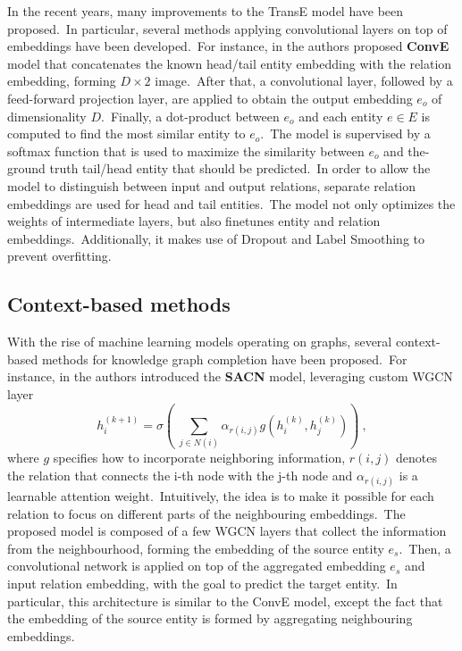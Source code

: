 \documentclass[longabstract, english, mgr]{iithesis}
\theoremstyle{default_theorem_style}\newtheorem{theorem}{Theorem}
\theoremstyle{default_theorem_style}\newtheorem{definition}{Definition}
\begin{document}
\noindent In the recent years, many improvements to the TransE model have been proposed.\ In particular, several
methods applying convolutional layers on top of embeddings have been developed.\ For instance, in \cite{conve_model} the
authors proposed \textbf{ConvE} model that concatenates the known head/tail entity embedding with the relation
embedding, forming $D \times 2$ image.\ After that, a convolutional layer, followed by a feed-forward projection layer,
are applied to obtain the output embedding $e_o$ of dimensionality $D$.\ Finally, a dot-product between $e_o$ and each
entity $e \in E$ is computed to find the most similar entity to $e_o$.\ The model is supervised by a softmax function
that is used to maximize the similarity between $e_o$ and the-ground truth tail/head entity that should be
predicted.\ In order to allow the model to distinguish between input and output relations, separate
relation embeddings are used for head and tail entities.\ The model not only optimizes the weights of intermediate
layers, but also finetunes entity and relation embeddings.\ Additionally, it makes use of Dropout and Label
Smoothing to prevent overfitting.

\subsection{Context-based methods}

With the rise of machine learning models operating on graphs, several context-based methods for knowledge graph
completion have been proposed.\ For instance, in \cite{sacn_model} the authors introduced the \textbf{SACN} model,
leveraging custom WGCN layer
$$
h_i^{(k + 1)} = \sigma\left(\ \sum_{j \in N(i)}\alpha_{r(i, j)} g(h_i^{(k)}, h_j^{(k)}) \right)\ ,
$$
where $g$ specifies how to incorporate neighboring information, $r(i, j)$ denotes the relation that connects the i-th
node with the j-th node and $\alpha_{r(i, j)}$ is a learnable attention weight.\ Intuitively, the idea is to make it
possible for each relation to focus on different parts of the neighbouring embeddings.\ The proposed model is composed
of a few WGCN layers that collect the information from the neighbourhood, forming the embedding of the source
entity $e_s$.\ Then, a convolutional network is applied on top of the aggregated embedding $e_s$ and input
relation embedding, with the goal to predict the target entity.\ In particular, this architecture is similar
to the ConvE model, except the fact that the embedding of the source entity is formed by aggregating neighbouring
embeddings.\newline
\end{document}

